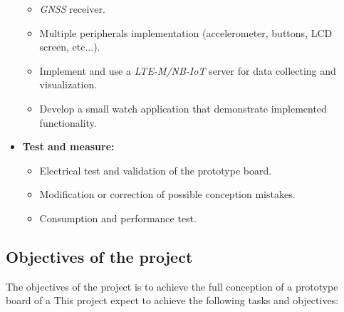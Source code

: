 \documentclass[Report.tex]{subfiles}
\begin{document}
\begin{itemize}
\begin{itemize}
		\item \textit{GNSS} receiver.
		\item Multiple peripherals implementation (accelerometer, buttons, LCD screen, etc...).
		\item Implement and use a \textit{LTE-M/NB-IoT} server for data collecting and visualization.
		\item Develop a small watch application that demonstrate implemented functionality.
	\end{itemize}
\item \textbf{Test and measure:}
	\begin{itemize}
		\item Electrical test and validation of the prototype board.
		\item Modification or correction of possible conception mistakes.
		\item Consumption and performance test.
	\end{itemize}
\end{itemize}

\subsection{Objectives of the project}

The objectives of the project is to achieve the full conception of a prototype board of a  This project expect to achieve the following tasks and objectives:
\end{document}
